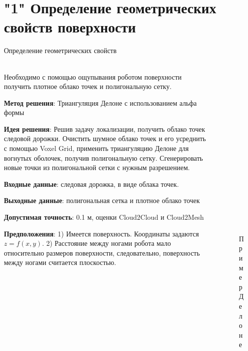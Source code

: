 \section{"1" Определение геометрических свойств поверхности}

\begin{frame}[t]{Определение геометрических свойств}
\framesubtitle{}
    \begin{columns}[T,onlytextwidth]
        \begin{column}{0.69\textwidth}
            \small
            Необходимо с помощью ощупывания роботом поверхности получить плотное облако точек и полигональную сетку.

            \textbf{Метод решения}: Триангуляция Делоне с использованием альфа формы

            \textbf{Идея решения}: Решив задачу локализации, получить облако точек следовой дорожки. Очистить шумное облако точек и его усреднить с помощью Voxel Grid, применить триангуляцию Делоне для вогнутых оболочек, получив полигональную сетку. Сгенерировать новые точки из полигональной сетки с нужным разрешением.

            \textbf{Входные данные}: следовая дорожка, в виде облака точек.
            
            \textbf{Выходные данные}: полигональная сетка и плотное облако точек
            
            \textbf{Допустимая точность}: 0.1 м, оценки Cloud2Cloud и Cloud2Mesh

            \textbf{Предположения}: 1) Имеется поверхность. Координаты задаются $z=f(x,y)$. 2) Расстояние между ногами робота мало относительно размеров поверхности, следовательно, поверхность между ногами считается плоскостью.   
        \end{column}
        \begin{column}{0.29\textwidth}
            \begin{figure}[H]
                \begin{subfigure}{0.99\textwidth}
                    \centering\includegraphics[height=2cm,width=1\textwidth,keepaspectratio]{../images/slides/delone_mag.png}
                    \caption{Пример Делоне}
                \end{subfigure}


\end{figure}
\end{column}
\end{columns}
\end{frame}

